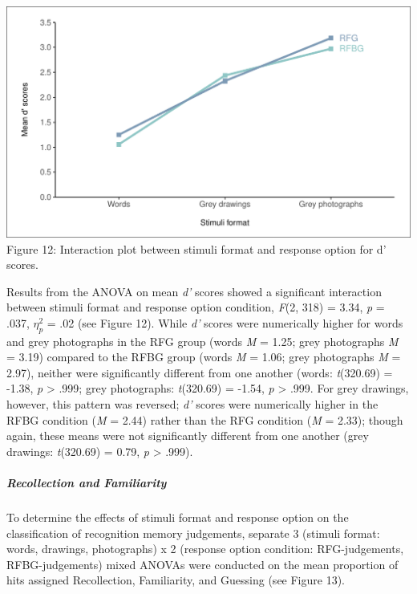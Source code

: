 \documentclass[
  11pt,
]{article}
\begin{document}
\includegraphics{R--Thesis_files/figure-latex/unnamed-chunk-41-1.pdf}
Figure 12: Interaction plot between stimuli format and response option
for d' scores. ~~

Results from the ANOVA on mean \emph{d'} scores showed a significant
interaction between stimuli format and response option condition,
\emph{F}(2, 318) = 3.34, \emph{p} = .037, \(\eta^2_p\) = .02 (see Figure
12). While \emph{d'} scores were numerically higher for words and grey
photographs in the RFG group (words \emph{M} = 1.25; grey photographs
\emph{M} = 3.19) compared to the RFBG group (words \emph{M} = 1.06; grey
photographs \emph{M} = 2.97), neither were significantly different from
one another (words: \emph{t}(320.69) = -1.38, \emph{p} \textgreater{}
.999; grey photographs: \emph{t}(320.69) = -1.54, \emph{p}
\textgreater{} .999. For grey drawings, however, this pattern was
reversed; \emph{d'} scores were numerically higher in the RFBG condition
(\emph{M} = 2.44) rather than the RFG condition (\emph{M} = 2.33);
though again, these means were not significantly different from one
another (grey drawings: \emph{t}(320.69) = 0.79, \emph{p} \textgreater{}
.999).

\hypertarget{recollection-and-familiarity}{%
\subparagraph{Recollection and
Familiarity}\label{recollection-and-familiarity}}

To determine the effects of stimuli format and response option on the
classification of recognition memory judgements, separate 3 (stimuli
format: words, drawings, photographs) x 2 (response option condition:
RFG-judgements, RFBG-judgements) mixed ANOVAs were conducted on the mean
proportion of hits assigned Recollection, Familiarity, and Guessing (see
Figure 13).
\end{document}

